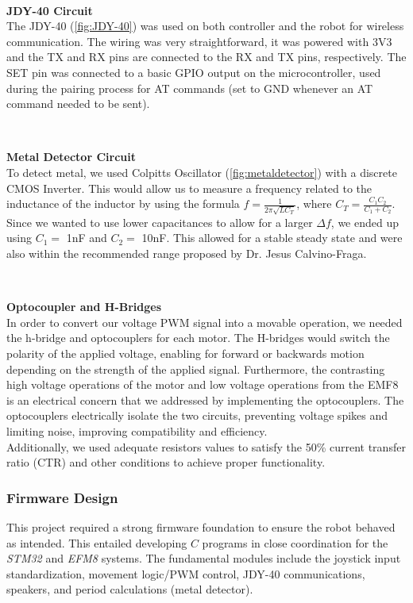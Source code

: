 \documentclass{article}
\begin{document}
\

\textbf{JDY-40 Circuit} \\
The JDY-40 (\ref{fig:JDY-40}) was used on both controller and the robot for wireless communication. The wiring was very straightforward, it was powered with 3V3 and the TX and RX pins are connected to the RX and TX pins, respectively. The SET pin was connected to a basic GPIO output on the microcontroller, used during the pairing process for AT commands (set to GND whenever an AT command needed to be sent).

\

\textbf{Metal Detector Circuit} \\
To detect metal, we used Colpitts Oscillator (\ref{fig:metaldetector}) with a discrete CMOS Inverter. This would allow us to measure a frequency related to the inductance of the inductor by using the formula $f = \frac{1}{2 \pi \sqrt{LC_T}}$, where $C_T = \frac{C_1C_2}{C_1+C_2}$. Since we wanted to use lower capacitances to allow for a larger $\Delta f$, we ended up using $C_1 =$ 1nF and $C_2 =$ 10nF. This allowed for a stable steady state and were also within the recommended range proposed by Dr. Jesus Calvino-Fraga.

\

\textbf{Optocoupler and H-Bridges} \\
In order to convert our voltage PWM signal into a movable operation, we needed the h-bridge and optocouplers for each motor. The H-bridges would switch the polarity of the applied voltage, enabling for forward or backwards motion depending on the strength of the applied signal. Furthermore, the contrasting high voltage operations of the motor and low voltage operations from the EMF8 is an electrical concern that we addressed by implementing the optocouplers. The optocouplers electrically isolate the two circuits, preventing voltage spikes and limiting noise, improving compatibility and efficiency. \\
Additionally, we used adequate resistors values to satisfy the 50\% current transfer ratio (CTR) and other conditions to achieve proper functionality.

\subsubsection{Firmware Design}
This project required a strong firmware foundation to ensure the robot behaved as intended. This entailed developing $C$ programs in close coordination for the \textit{STM32} and \textit{EFM8} systems.
The fundamental modules include the joystick input standardization, movement logic/PWM control, JDY-40 communications, speakers, and period calculations (metal detector).
\end{document}
